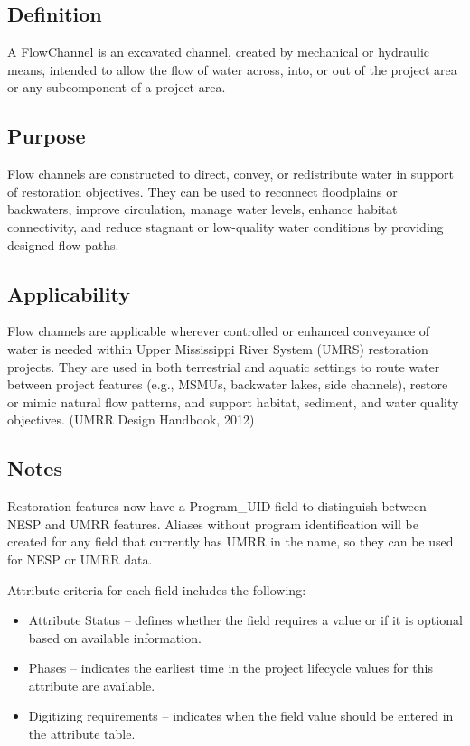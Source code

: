 \documentclass[
  letterpaper,
  DIV=11,
  numbers=noendperiod]{scrreprt}
\providecommand{\tightlist}{%
  \setlength{\itemsep}{0pt}\setlength{\parskip}{0pt}}
\begin{document}
\subsection{Definition}\label{definition-5}

A FlowChannel is an excavated channel, created by mechanical or
hydraulic means, intended to allow the flow of water across, into, or
out of the project area or any subcomponent of a project area.

\subsection{Purpose}\label{purpose-7}

Flow channels are constructed to direct, convey, or redistribute water
in support of restoration objectives. They can be used to reconnect
floodplains or backwaters, improve circulation, manage water levels,
enhance habitat connectivity, and reduce stagnant or low-quality water
conditions by providing designed flow paths.

\subsection{Applicability}\label{applicability-5}

Flow channels are applicable wherever controlled or enhanced conveyance
of water is needed within Upper Mississippi River System (UMRS)
restoration projects. They are used in both terrestrial and aquatic
settings to route water between project features (e.g., MSMUs, backwater
lakes, side channels), restore or mimic natural flow patterns, and
support habitat, sediment, and water quality objectives. (UMRR Design
Handbook, 2012)

\subsection{Notes}\label{notes-7}

Restoration features now have a Program\_UID field to distinguish
between NESP and UMRR features. Aliases without program identification
will be created for any field that currently has UMRR in the name, so
they can be used for NESP or UMRR data.

Attribute criteria for each field includes the following:

\begin{itemize}
\tightlist
\item
  Attribute Status -- defines whether the field requires a value or if
  it is optional based on available information.
\item
  Phases -- indicates the earliest time in the project lifecycle values
  for this attribute are available.
\item
  Digitizing requirements -- indicates when the field value should be
  entered in the attribute table.
\end{itemize}
\end{document}
